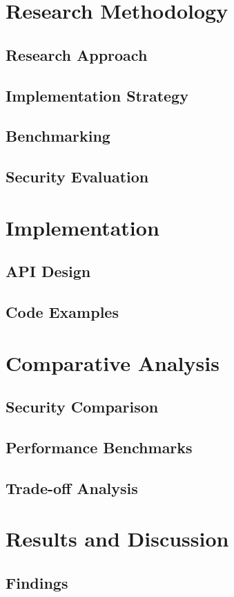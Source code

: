 \documentclass[12pt,a4paper,oneside]{report}
\begin{document}
\chapter{Research Methodology}
\section{Research Approach}
\section{Implementation Strategy}
\section{Benchmarking}
\section{Security Evaluation}

\chapter{Implementation}
\section{API Design}
\section{Code Examples}

\chapter{Comparative Analysis}
\section{Security Comparison}
\section{Performance Benchmarks}
\section{Trade-off Analysis}

\chapter{Results and Discussion}
\section{Findings}
\end{document}
